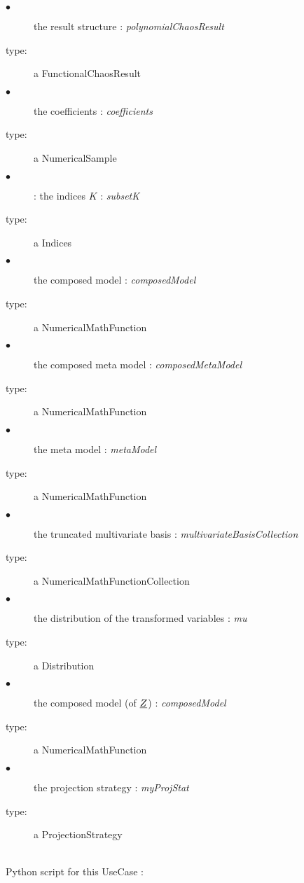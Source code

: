 {
  \begin{description}
  \item[$\bullet$] the  result structure : {\itshape polynomialChaosResult}
  \item[type:] a FunctionalChaosResult
  \item[$\bullet$] the coefficients : {\itshape coefficients}
  \item[type:] a NumericalSample
  \item[$\bullet$] : the indices $K$ : {\itshape subsetK}
  \item[type:] a Indices
  \item[$\bullet$] the composed model : {\itshape composedModel}
  \item[type:] a NumericalMathFunction
  \item[$\bullet$] the composed meta model : {\itshape composedMetaModel}
  \item[type:] a NumericalMathFunction
  \item[$\bullet$] the meta model : {\itshape metaModel}
  \item[type:] a NumericalMathFunction
  \item[$\bullet$]  the truncated multivariate basis : {\itshape multivariateBasisCollection}
  \item[type:] a NumericalMathFunctionCollection
  \item[$\bullet$] the distribution of the transformed variables : {\itshape mu}
  \item[type:] a Distribution
  \item[$\bullet$]   the composed model (of ${\underline{Z}}$) : {\itshape composedModel}
  \item[type:] a NumericalMathFunction
  \item[$\bullet$]   the projection strategy : {\itshape myProjStat}
  \item[type:] a ProjectionStrategy
  \end{description}
}

\textspace\\
Python  script for this UseCase :


